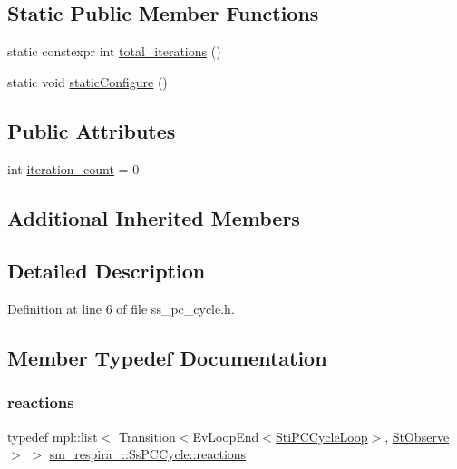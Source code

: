 \subsection*{Static Public Member Functions}
\begin{DoxyCompactItemize}
\item 
static constexpr int \hyperlink{structsm__respira__1_1_1SsPCCycle_a502cf54224fed364d076f60cb56c3741}{total\+\_\+iterations} ()
\item 
static void \hyperlink{structsm__respira__1_1_1SsPCCycle_a81063421ba5fb15c8bebba529dca7cb9}{static\+Configure} ()
\end{DoxyCompactItemize}
\subsection*{Public Attributes}
\begin{DoxyCompactItemize}
\item 
int \hyperlink{structsm__respira__1_1_1SsPCCycle_a57d8a8bbc591183dcf194ac46d1f3a7f}{iteration\+\_\+count} = 0
\end{DoxyCompactItemize}
\subsection*{Additional Inherited Members}


\subsection{Detailed Description}


Definition at line 6 of file ss\+\_\+pc\+\_\+cycle.\+h.



\subsection{Member Typedef Documentation}
\mbox{\label{structsm__respira__1_1_1SsPCCycle_a50a87951711af774225321a17085c702}} 
\subsubsection{\texorpdfstring{reactions}{reactions}}
{\footnotesize\ttfamily typedef mpl\+::list$<$ Transition$<$Ev\+Loop\+End$<$\hyperlink{structsm__respira__1_1_1pc__cycle__inner__states_1_1StiPCCycleLoop}{Sti\+P\+C\+Cycle\+Loop}$>$, \hyperlink{structsm__respira__1_1_1StObserve}{St\+Observe}$>$ $>$ \hyperlink{structsm__respira__1_1_1SsPCCycle_a50a87951711af774225321a17085c702}{sm\+\_\+respira\+\_\+::\+Ss\+P\+C\+Cycle\+::reactions}}



